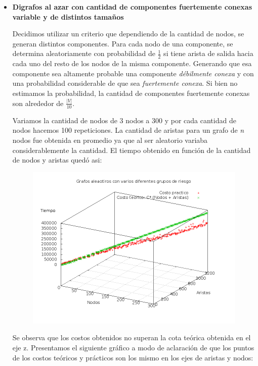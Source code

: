 \begin{itemize}
\item \textbf{Digrafos al azar con cantidad de componentes fuertemente conexas variable y de distintos tamaños}

\quad Decidimos utilizar un criterio que dependiendo de la cantidad de nodos, se generan distintos componentes. Para cada nodo de una componente, se determina aleatoriamente con probabilidad de $ \frac{1}{2} $ si tiene arista de salida hacia cada uno del resto de los nodos de la misma componente. Generando que esa componente sea altamente probable una componente \textit{débilmente conexa} y con una probabilidad considerable de que sea \textit{fuertemente conexa}. Si bien no estimamos la probabilidad, la cantidad de componentes fuertemente conexas son alrededor de $ \frac{\vert  V \vert}{10} $.

\quad

\quad Variamos la cantidad de nodos de 3 nodos a 300 y por cada cantidad de nodos hacemos 100 repeticiones. La cantidad de aristas para un grafo de \textit{n} nodos fue obtenida en promedio ya que al ser aleatorio variaba considerablemente la cantidad. El tiempo obtenido en función de la cantidad de nodos y aristas quedó asi:

\begin{figure}[H]
	\centering
	\includegraphics[scale=0.6]{ej3-grafico3.png}
\end{figure}

\quad Se observa que los costos obtenidos no superan la cota teórica obtenida en el eje z. Presentamos el siguiente gráfico a modo de aclaración de que los puntos de los costos teóricos y prácticos son los mismo en los ejes de aristas y nodos:


\end{itemize}

